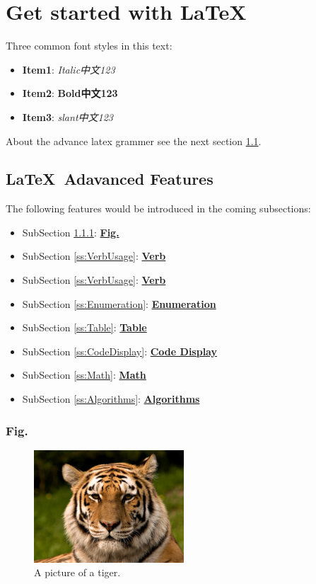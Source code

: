\chapter{Get started with \LaTeX\ }
\label{c:GetStarted}
Three common font styles in this text: 
\begin{itemize}
    \item \textbf{Item1}: \textit{Italic中文123}     
    \item \textbf{Item2}: \textbf{Bold中文123}
    \item \textbf{Item3}: \textsl{slant中文123}
\end{itemize}

About the advance latex grammer see the next section \ref{s:AdvancedFeatures}.


\section{\LaTeX\ Adavanced Features}
\label{s:AdvancedFeatures}
The following features would be introduced in the coming subsections:
\begin{itemize}
    \item SubSection \ref{ss:Fig.}: \hyperref[ss:Fig.]{\textbf{Fig.}}
    \item SubSection \ref{ss:VerbUsage}: \hyperref[ss:VerbUsage]{\textbf{Verb}}
    \item SubSection \ref{ss:VerbUsage}: \hyperref[ss:VerbUsage]{\textbf{Verb}}
    \item SubSection \ref{ss:Enumeration}: \hyperref[ss:Enumeration]{\textbf{Enumeration}}
    \item SubSection \ref{ss:Table}: \hyperref[ss:Table]{\textbf{Table}}
    \item SubSection \ref{ss:CodeDisplay}: \hyperref[ss:CodeDisplay]{\textbf{Code Display}}
    \item SubSection \ref{ss:Math}: \hyperref[ss:Math]{\textbf{Math}}
    \item SubSection \ref{ss:Algorithms}: \hyperref[ss:Algorithms]{\textbf{Algorithms}}
\end{itemize}

\subsection{Fig.}
\label{ss:Fig.}
\begin{figure}[htpb!]
  \centering
    \includegraphics[width=0.5\textwidth]{fig/tiger.jpeg}
    \caption{\label{fig:tiger}A picture of a tiger.}
\end{figure}

